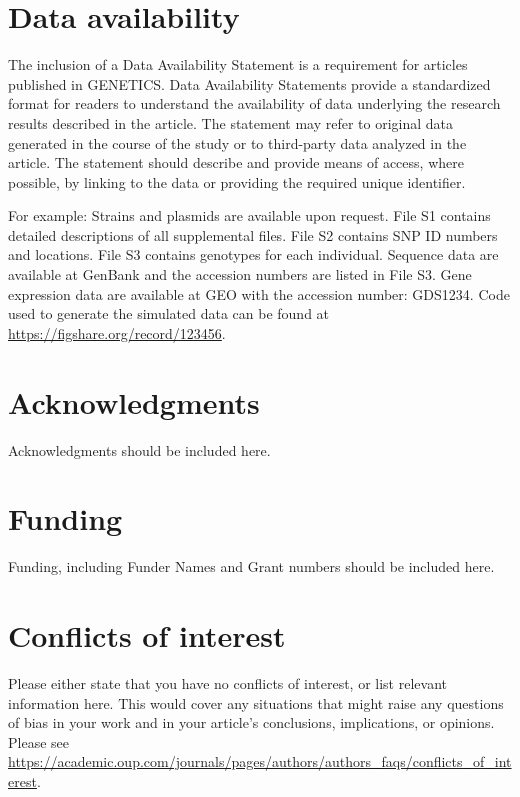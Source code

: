 \documentclass[9pt,twocolumn,twoside,lineno]{gsajnl}
\begin{document}
\section{Data availability}

The inclusion of a Data Availability Statement is a requirement for articles published in GENETICS. Data Availability Statements provide a standardized format for readers to understand the availability of data underlying the research results described in the article. The statement may refer to original data generated in the course of the study or to third-party data analyzed in the article. The statement should describe and provide means of access, where possible, by linking to the data or providing the required unique identifier.

For example: Strains and plasmids are available upon request. File S1 contains detailed descriptions of all supplemental files. File S2 contains SNP ID numbers and locations. File S3 contains genotypes for each individual. Sequence data are available at GenBank and the accession numbers are listed in File S3. Gene expression data are available at GEO with the accession number: GDS1234. Code used to generate the simulated data can be found at \url{https://figshare.org/record/123456}.

\section{Acknowledgments}
Acknowledgments should be included here.

\section{Funding}
Funding, including Funder Names and Grant numbers should be included here.

\section{Conflicts of interest}
Please either state that you have no conflicts of interest, or list relevant information here.  This would cover any situations that might raise any questions of bias in your work and in your article’s conclusions, implications, or opinions. Please see \url{https://academic.oup.com/journals/pages/authors/authors_faqs/conflicts_of_interest}.


\end{document}
